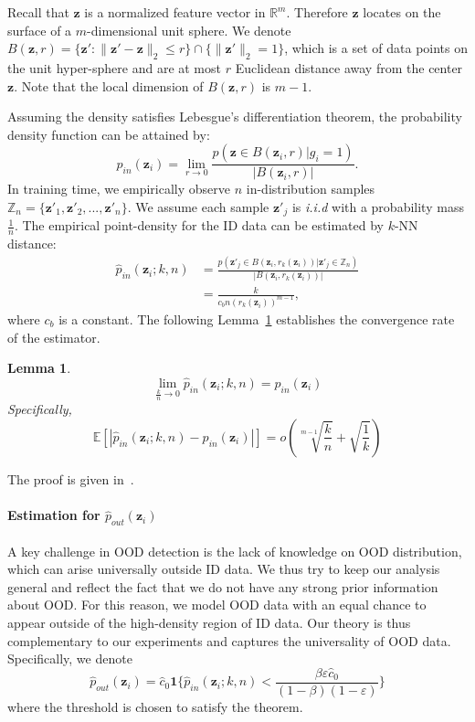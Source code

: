 \documentclass[nohyperref]{article}
\newcommand{\bz}{\mathbf{z}}
\theoremstyle{plain}
\newtheorem{lemma}[theorem]{Lemma}
\theoremstyle{definition}
\theoremstyle{remark}
\begin{document}
Recall that $\bz$ is a normalized feature vector in $\mathbb{R}^{m}$. Therefore $\bz$ locates on the surface of a $m$-dimensional unit sphere. 
We denote $B(\bz, r) = \{\bz':\lVert\bz'-\bz\rVert_2 \le r\} \cap \{\lVert\bz'\rVert_2 = 1\}$, which is a set of data points on the unit hyper-sphere and are at most $r$ Euclidean distance away from the center $\bz$. Note that the local dimension of $B(\bz, r)$ is $m-1$. 

Assuming the density satisfies Lebesgue's differentiation theorem, the probability density function can be attained by: 
$$ 
p_{in}(\bz_i) = \lim_{r \rightarrow 0} \frac{p(\bz \in B(\bz_i, r)|g_i = 1)}{|B(\bz_i, r)|}.
$$
In training time, we empirically observe $n$ in-distribution samples $\mathbb{Z}_n = \{\bz'_1, \bz'_2, ..., \bz'_n \}$. We assume each sample $\bz'_j$ is \emph{i.i.d} with a probability mass $\frac{1}{n}$. The empirical point-density for the ID data can be estimated by $k$-NN distance:
\begin{align*}
 \hat{p}_{in}(\bz_i;k, n) &= \frac{p(\bz'_j \in B(\bz_i, r_k(\bz_i))|\bz'_j \in \mathbb{Z}_n)}{|B(\bz_i, r_k(\bz_i))|} \\
 &= \frac{k}{c_bn(r_k(\bz_i))^{m-1}}, 
\end{align*}
where $c_b$ is a constant. The following Lemma~\ref{lemma:l1bound} establishes the convergence rate of the estimator.

\begin{lemma}
\label{lemma:l1bound}
$$\lim_{\frac{k}{n} \rightarrow 0} \hat{p}_{in}(\bz_i;k, n) = p_{in}(\bz_i)$$ 
Specifically,
$$\mathbb{E}[|\hat{p}_{in}(\bz_i;k, n) - p_{in}(\bz_i)|] = o(\sqrt[m-1]{\frac{k}{n}}+ \sqrt{\frac{1}{k}})$$
\end{lemma}
The proof is given in~\cite{zhao2020analysis}. 

\paragraph{Estimation for $\hat p_{out}(\bz_i)$}
A key challenge in OOD detection is the lack of knowledge on OOD distribution, which can arise universally outside ID data. We thus try to keep our analysis general and reflect the fact that we do not have any strong prior information about OOD. For this reason, we model OOD data with an equal chance to appear outside of the high-density region of ID data. Our theory is thus complementary to our experiments and captures the universality of OOD data. 
Specifically, we denote $$\hat{p}_{out}(\bz_i) = \hat{c}_{0}\mathbf{1}\{\hat{p}_{in}(\bz_i;k, n) < \frac{\beta\varepsilon\hat{c}_{0}}{(1-\beta)(1-\varepsilon)}\}$$
where the threshold is chosen to satisfy the theorem. 
\end{document}
